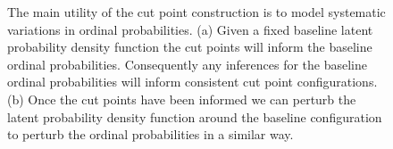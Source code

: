 \documentclass[
  letterpaper,
  DIV=11,
  numbers=noendperiod]{scrartcl}
\begin{document}
\begin{figure}

\begin{minipage}{0.50\linewidth}


\subcaption{\label{fig-flow-baseline}}

\end{minipage}%
%
\begin{minipage}{0.50\linewidth}


\subcaption{\label{fig-flow-perturb}}

\end{minipage}%

\caption{\label{fig-flow}The main utility of the cut point construction
is to model systematic variations in ordinal probabilities. (a) Given a
fixed baseline latent probability density function the cut points will
inform the baseline ordinal probabilities. Consequently any inferences
for the baseline ordinal probabilities will inform consistent cut point
configurations. (b) Once the cut points have been informed we can
perturb the latent probability density function around the baseline
configuration to perturb the ordinal probabilities in a similar way.}

\end{figure}%
\end{document}
